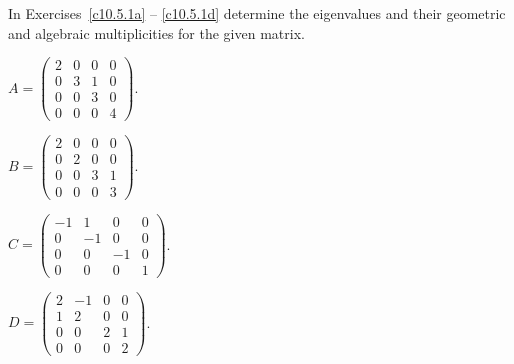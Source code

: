 \EXER

\TEXER

\noindent In Exercises~\ref{c10.5.1a} -- \ref{c10.5.1d} determine the 
eigenvalues and their geometric and algebraic multiplicities for the 
given matrix.
\begin{exercise} \label{c10.5.1a}
$A = \left(\begin{array}{cccc} 2 & 0 &  0 & 0\\ 0 & 3 & 1 & 0 \\
0 & 0 & 3 & 0 \\ 0 & 0 & 0 & 4 \end{array}\right)$.
\end{exercise}
\begin{exercise} \label{c10.5.1b}
$B = \left(\begin{array}{cccc} 2 & 0 &  0 & 0\\ 0 & 2 & 0 & 0 \\
0 & 0 & 3 & 1 \\ 0 & 0 & 0 & 3 \end{array}\right)$.
\end{exercise}
\begin{exercise} \label{c10.5.1c}
$C = \left(\begin{array}{rrrr} -1 & 1 &  0 & 0\\ 0 & -1 & 0 & 0 \\
0 & 0 & -1 & 0 \\ 0 & 0 & 0 & 1 \end{array}\right)$.
\end{exercise}
\begin{exercise} \label{c10.5.1d}
$D = \left(\begin{array}{rrrr} 2 & -1 &  0 & 0\\ 1 & 2 & 0 & 0 \\
0 & 0 & 2 & 1 \\ 0 & 0 & 0 & 2 \end{array}\right)$.
\end{exercise}

